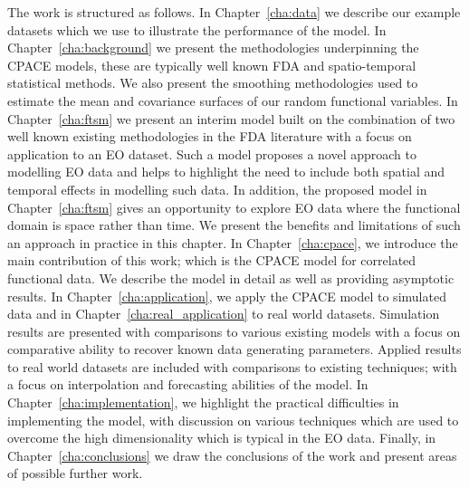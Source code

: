 The work is structured as follows.
In Chapter~\ref{cha:data} we describe our example datasets which we use to illustrate the performance of the model.
In Chapter~\ref{cha:background} we present the methodologies underpinning the CPACE models, these are typically well known FDA and spatio-temporal statistical methods.
We also present the smoothing methodologies used to estimate the mean and covariance surfaces of our random functional variables.
In Chapter~\ref{cha:ftsm} we present an interim model built on the combination of two well known existing methodologies in the FDA literature with a focus on application to an EO dataset.
Such a model proposes a novel approach to modelling EO data and helps to highlight the need to include both spatial and temporal effects in modelling such data.
In addition, the proposed model in Chapter~\ref{cha:ftsm} gives an opportunity to explore EO data where the functional domain is space rather than time.
We present the benefits and limitations of such an approach in practice in this chapter.
In Chapter~\ref{cha:cpace}, we introduce the main contribution of this work; which is the CPACE model for correlated functional data.
We describe the model in detail as well as providing asymptotic results.
In Chapter~\ref{cha:application}, we apply the CPACE model to simulated data and in Chapter~\ref{cha:real_application} to real world datasets.
Simulation results are presented with comparisons to various existing models with a focus on comparative ability to recover known data generating parameters.
Applied results to real world datasets are included with comparisons to existing techniques; with a focus on interpolation and forecasting abilities of the model.
In Chapter~\ref{cha:implementation}, we highlight the practical difficulties in implementing the model, with discussion on various techniques which are used to overcome the high dimensionality which is typical in the EO data.
Finally, in Chapter~\ref{cha:conclusions} we draw the conclusions of the work and present areas of possible further work.
